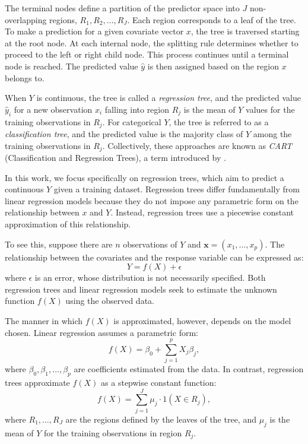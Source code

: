 \documentclass[a4paper,11pt]{article}
\begin{document}
The terminal nodes define a partition of the predictor space into \( J \) non-overlapping regions, \( R_1, R_2, \ldots, R_J \). Each region corresponds to a leaf of the tree. To make a prediction for a given covariate vector \( x \), the tree is traversed starting at the root node. At each internal node, the splitting rule determines whether to proceed to the left or right child node. This process continues until a terminal node is reached. The predicted value \( \hat{y} \) is then assigned based on the region \( x \) belongs to.

When \( Y \) is continuous, the tree is called a \textit{regression tree}, and the predicted value \( \hat{y}_i \) for a new observation \( x_i \) falling into region \( R_j \) is the mean of \( Y \) values for the training observations in \( R_j \). For categorical \( Y \), the tree is referred to as a \textit{classification tree}, and the predicted value is the majority class of \( Y \) among the training observations in \( R_j \). Collectively, these approaches are known as \textit{CART} (Classification and Regression Trees), a term introduced by \cite{Gordon_Breiman_Friedman_Olshen_Stone_1984}.

In this work, we focus specifically on regression trees, which aim to predict a continuous \( Y \) given a training dataset. Regression trees differ fundamentally from linear regression models because they do not impose any parametric form on the relationship between \( x \) and \( Y \). Instead, regression trees use a piecewise constant approximation of this relationship.

To see this, suppose there are \( n \) observations of \( Y \) and \(\mathbf{x} = (x_1, \ldots, x_p) \). The relationship between the covariates and the response variable can be expressed as:
\begin{equation}
Y = f(X) + \epsilon \label{regression}
\end{equation}
where \( \epsilon \) is an error, whose distribution is not necessarily specified. Both regression trees and linear regression models seek to estimate the unknown function \( f(X) \) using the observed data.

The manner in which \( f(X) \) is approximated, however, depends on the model chosen. Linear regression assumes a parametric form:
\[
f(X) = \beta_0 + \sum_{j=1}^p X_j \beta_j,
\]
where \( \beta_0, \beta_1, \ldots, \beta_p \) are coefficients estimated from the data. In contrast, regression trees approximate \( f(X) \) as a stepwise constant function:
\[
f(X) = \sum_{j=1}^J \mu_j \cdot 1(X \in R_j),
\]
where \( R_1, \ldots, R_J \) are the regions defined by the leaves of the tree, and \( \mu_j \) is the mean of \( Y \) for the training observations in region \( R_j \).
\end{document}
